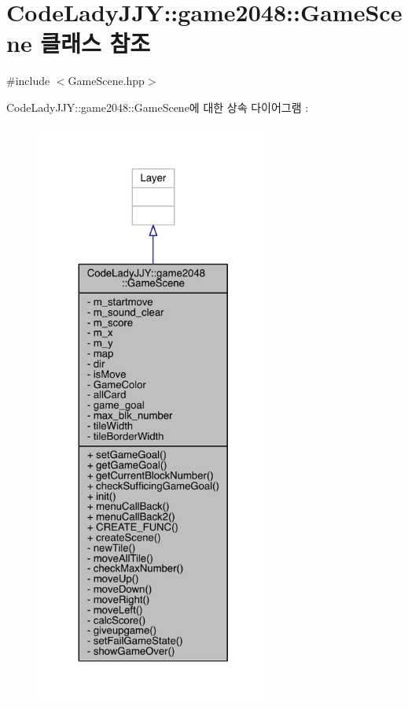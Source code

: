 \hypertarget{class_code_lady_j_j_y_1_1game2048_1_1_game_scene}{}\section{Code\+Lady\+J\+JY\+:\+:game2048\+:\+:Game\+Scene 클래스 참조}
\label{class_code_lady_j_j_y_1_1game2048_1_1_game_scene}


{\ttfamily \#include $<$Game\+Scene.\+hpp$>$}



Code\+Lady\+J\+JY\+:\+:game2048\+:\+:Game\+Scene에 대한 상속 다이어그램 \+: 
\nopagebreak
\begin{figure}[H]
\begin{center}
\leavevmode
\includegraphics[height=550pt]{d0/d64/class_code_lady_j_j_y_1_1game2048_1_1_game_scene__inherit__graph}
\end{center}
\end{figure}


